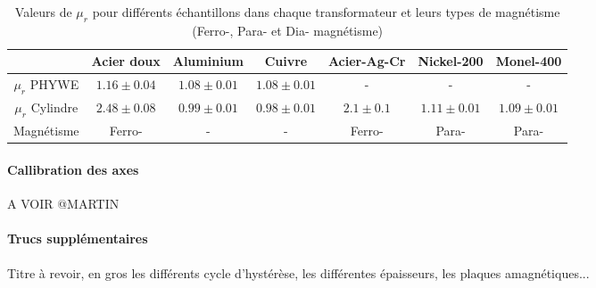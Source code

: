 \begin{table}[h]
    \centering
    \begin{tabulary}{\linewidth}{c c c c c c c}
        \toprule
        & Acier doux & Aluminium & Cuivre & Acier-Ag-Cr & Nickel-200 & Monel-400 \\
        \midrule
        \(\mu_r\) PHYWE & \(1.16 \pm 0.04\) & \(1.08 \pm 0.01\) & \(1.08 \pm 0.01\) & - & - & - \\
        \(\mu_r\) Cylindre & \(2.48 \pm 0.08\) & \(0.99 \pm 0.01\) & \(0.98 \pm 0.01\) & \(2.1 \pm 0.1\) & \(1.11 \pm 0.01\) & \(1.09 \pm 0.01\) \\
        Magnétisme & Ferro- & - & - & Ferro- & Para- & Para- \\
        \bottomrule
    \end{tabulary}
    \caption{Valeurs de \(\mu_r\) pour différents échantillons dans chaque transformateur et leurs types de magnétisme (Ferro-, Para- et Dia- magnétisme)}
    \label{tab:mu_r}
\end{table}

\paragraph{Callibration des axes}
A VOIR @MARTIN

\paragraph{Trucs supplémentaires}
Titre à revoir, en gros les différents cycle d'hystérèse, les différentes épaisseurs, les plaques amagnétiques...


